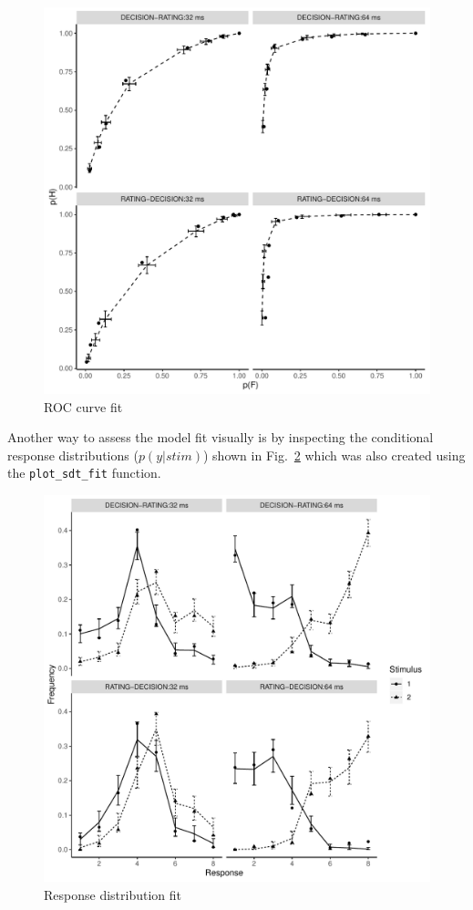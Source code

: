 \documentclass[oneside,a4paper]{article}
\begin{document}
\begin{figure}[H]
  \centering
  \includegraphics[width=.8\linewidth]{roc_fit.pdf}
  \caption{ROC curve fit}
  \label{fig:3}
\end{figure}

Another way to assess the model fit visually is by inspecting the
conditional response distributions ($p(y|stim)$) shown in
Fig.~\ref{fig:4} which was also created using the
\texttt{plot\_sdt\_fit} function.

\begin{figure}[H]
  \centering
  \includegraphics[width=.8\linewidth]{response_fit.pdf}
  \caption{Response distribution fit}
  \label{fig:4}
\end{figure}
\end{document}
